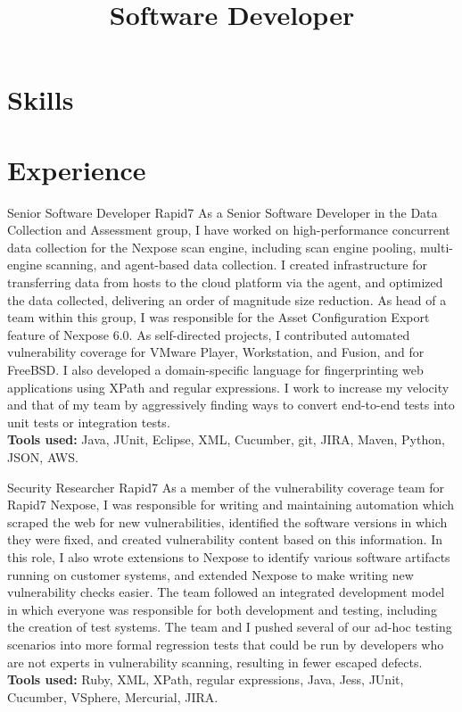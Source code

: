 \documentclass[11pt,letterpaper]{moderncv}
\title{Software Developer}
\begin{document}
\maketitle

\section{Skills}


\section{Experience}

{Senior Software Developer}
{Rapid7}
{}{}
{
As a Senior Software Developer in the Data Collection and Assessment group, I have worked on high-performance concurrent data collection for the Nexpose scan engine, including scan engine pooling, multi-engine scanning, and agent-based data collection. I created infrastructure for transferring data from hosts to the cloud platform via the agent, and optimized the data collected, delivering an order of magnitude size reduction. As head of a team within this group, I was responsible for the Asset Configuration Export feature of Nexpose 6.0. As self-directed projects, I contributed automated vulnerability coverage for VMware Player, Workstation, and Fusion, and for FreeBSD. I also developed a domain-specific language for fingerprinting web applications using XPath and regular expressions. I work to increase my velocity and that of my team by aggressively finding ways to convert end-to-end tests into unit tests or integration tests. \\
\textbf{Tools used:} Java, JUnit, Eclipse, XML, Cucumber, git, JIRA, Maven, Python, JSON, AWS.
}

\vspace*{0.2\baselineskip}
{Security Researcher}
{Rapid7}
{}{}
{
As a member of the vulnerability coverage team for Rapid7 Nexpose, I was responsible for writing and maintaining automation which scraped the web for new vulnerabilities, identified the software versions in which they were fixed, and created vulnerability content based on this information.  In this role, I also wrote extensions to Nexpose to identify various software artifacts running on customer systems, and extended Nexpose to make writing new vulnerability checks easier.  The team followed an integrated development model in which everyone was responsible for both development and testing, including the creation of test systems. The team and I pushed several of our ad-hoc testing scenarios into more formal regression tests that could be run by developers who are not experts in vulnerability scanning, resulting in fewer escaped defects. \\
\textbf{Tools used:} Ruby, XML, XPath, regular expressions, Java, Jess, JUnit, Cucumber, VSphere, Mercurial, JIRA.
}
\end{document}
